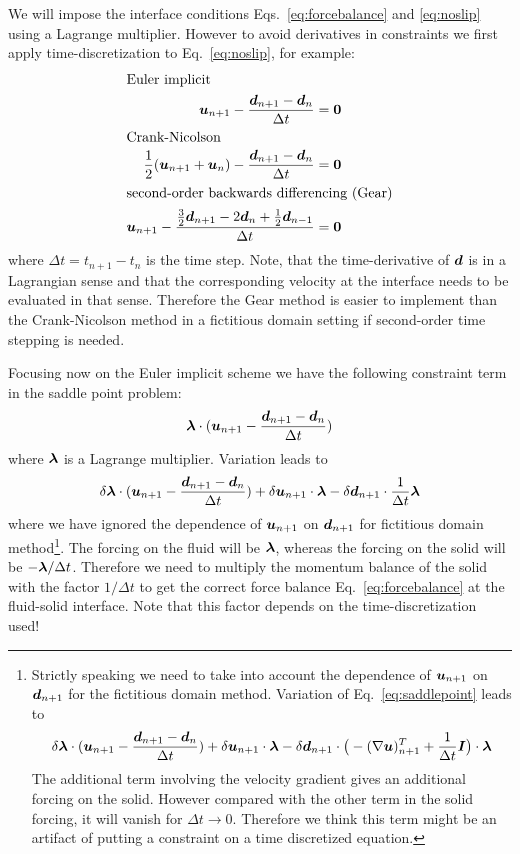 We will impose the interface conditions Eqs.~\eqref{eq:forcebalance} and
\eqref{eq:noslip} using a Lagrange multiplier. However to avoid derivatives
in constraints we first apply time-discretization 
to Eq.~\eqref{eq:noslip}, for example:
\begin{align}
\intertext{Euler implicit}
   \boldsymbol{u}_{n+1}-\frac{\boldsymbol{d}_{n+1}-\boldsymbol{d}_n}{\Delta t}&=\boldsymbol{0}
   \label{eq:constr_solid_fluid_Euler}\\
\intertext{Crank-Nicolson}
   \frac12(\boldsymbol{u}_{n+1}+\boldsymbol{u}_n)-\frac{\boldsymbol{d}_{n+1}-\boldsymbol{d}_n}{\Delta t}&=\boldsymbol{0}
   \label{eq:constr_solid_fluid_CN}\\
\intertext{second-order backwards differencing (Gear)}
   \boldsymbol{u}_{n+1}-\frac{\frac32\boldsymbol{d}_{
              n+1}-2\boldsymbol{d}_n+\frac12\boldsymbol{d}_{n-1}}{\Delta t}&=\boldsymbol{0}
   \label{eq:constr_solid_fluid_BDF2}
\end{align}
where $\Delta t=t_{n+1}-t_n$ is the time step. Note, that the time-derivative
of $\boldsymbol{d}$ is in a Lagrangian sense and that the corresponding velocity
at the interface needs to be evaluated in that sense.
Therefore the Gear method is easier to implement than the Crank-Nicolson method
in a fictitious domain setting if second-order time stepping is needed.

Focusing now on the Euler implicit scheme
we have the following constraint term in the
saddle point problem:
\begin{equation}
   \boldsymbol{\lambda}\cdot(\boldsymbol{u}_{n+1}-\frac{\boldsymbol{d}_{n+1}-\boldsymbol{d}_n}{\Delta t})
\label{eq:saddlepoint}
\end{equation}
where $\boldsymbol{\lambda}$ is a Lagrange multiplier. Variation leads to
\begin{equation}
   \delta\boldsymbol{\lambda}\cdot(\boldsymbol{u}_{n+1}-\frac{\boldsymbol{d}_{n+1}-\boldsymbol{d}_n}{\Delta t})+
   \delta\boldsymbol{u}_{n+1}\cdot\boldsymbol{\lambda}
   -\delta\boldsymbol{d}_{n+1}\cdot\frac{1}{\Delta t}\boldsymbol{\lambda}
\end{equation}
where we have ignored the dependence of $\boldsymbol{u}_{n+1}$ on $\boldsymbol{d}_{n+1}$ for
fictitious domain method\footnote{
Strictly speaking we need to take into account
the dependence of $\boldsymbol{u}_{n+1}$ on $\boldsymbol{d}_{n+1}$ for
the fictitious domain method. Variation of Eq.~\eqref{eq:saddlepoint}
leads to
\[
   \delta\boldsymbol{\lambda}\cdot(\boldsymbol{u}_{n+1}-\frac{\boldsymbol{d}_{n+1}-\boldsymbol{d}_n}{\Delta t})+
   \delta\boldsymbol{u}_{n+1}\cdot\boldsymbol{\lambda}-
   \delta\boldsymbol{d}_{n+1}\cdot\big(-(\nabla\boldsymbol{u})_{n+1}^T+
               \frac{1}{\Delta t}\boldsymbol{I}\big)\cdot\boldsymbol{\lambda}
\]
The additional term involving the velocity gradient gives an additional forcing
on the solid. However compared with the other term in the solid forcing, it will
vanish for $\Delta t\rightarrow0$. Therefore we think this term might be
an artifact of putting a constraint on a time discretized equation.
}.
The forcing on the fluid will be $\boldsymbol{\lambda}$, whereas the forcing on
the solid will be $-\boldsymbol{\lambda}/\Delta t$. Therefore we need
to multiply the momentum balance of the solid with the factor $1/\Delta t$ to
get the correct force balance Eq.~\eqref{eq:forcebalance} at the fluid-solid
interface. Note that this factor depends on the time-discretization used!

